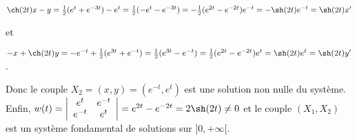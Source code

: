 {\begin{enumerate}
{\begin{center}
$\ch(2t)x-y= \frac{1}{2}(e^{t}+e^{-3t})-e^{t}= \frac{1}{2}(-e^{t}-e^{-3t})=- \frac{1}{2}(e^{2t}-e^{-2t})e^{-t}=-\sh(2t)e^{-t}=\sh(2t)x'$
\end{center}

et

\begin{center}
$-x+\ch(2t)y=-e^{-t}+ \frac{1}{2}(e^{3t}+e^{-t})= \frac{1}{2}(e^{3t}-e^{-t})= \frac{1}{2}(e^{2t}-e^{-2t})e^{t}=\sh(2t)e^{t}=\sh(2t)y'$.
\end{center}

Donc le couple $X_2=(x,y)=(e^{-t},e^{t})$ est une solution non nulle du système. Enfin, $w(t)=\left|
\begin{array}{cc}
e^t&e^{-t}\\
e^{-t}&e^t
\end{array}
\right|=e^{2t}-e^{-2t}=2\sh(2t)\neq0$ et le couple $(X_1,X_2)$ est un système fondamental de solutions sur $]0,+\infty[$.

\begin{center}
\shadowbox{
$\mathcal{S}_{]0,+\infty[}=\left\{
t\mapsto\left(
\begin{array}{c}
\lambda e^t+\mu e^{-t}\\
\lambda e^{-t}+\mu e^t
\end{array}
\right),\;(\lambda,\mu)\in\Rr^2\right\}$.
}
\end{center}}
\end{enumerate}
}
